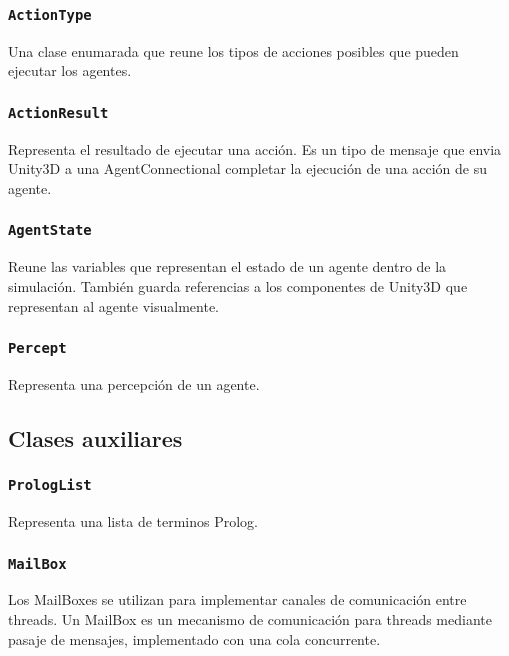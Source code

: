 \documentclass[a4paper,oneside]{article}
\begin{document}
\subsubsection{\texttt{ActionType}}

Una clase enumarada que reune los tipos de acciones posibles que pueden ejecutar
los agentes.

\subsubsection{\texttt{ActionResult}}

Representa el resultado de ejecutar una acción. 
Es un tipo de mensaje que envia Unity3D a una AgentConnectional completar la
ejecución de una acción de su agente.

\subsubsection{\texttt{AgentState}}

Reune las variables que representan el estado de un agente dentro de la
simulación.
También guarda referencias a los componentes de Unity3D que representan al agente
visualmente. 

\subsubsection{\texttt{Percept}}

Representa una percepción de un agente. 

\subsection{Clases auxiliares}

\subsubsection{\texttt{PrologList}}

Representa una lista de terminos Prolog. 

\subsubsection{\texttt{MailBox}}

Los MailBoxes se utilizan para implementar canales de comunicación entre threads.
Un MailBox es un mecanismo de comunicación para threads mediante pasaje de 
mensajes, implementado con una cola concurrente.
\end{document}
